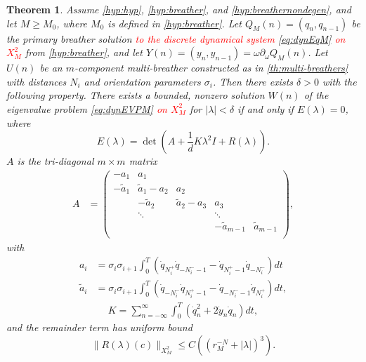 \documentclass[12pt,reqno]{amsart}
\newtheorem{theorem}{Theorem}
\theoremstyle{definition}
\newcommand{\revised}[1]{ \textcolor{red}{#1} }
\begin{document}
\begin{theorem}\label{th:spectrum}
Assume \cref{hyp:hyp}, \cref{hyp:breather}, and \cref{hyp:breathernondegen}, and let $M \geq M_0$, where $M_0$ is defined in \cref{hyp:breather}. Let $Q_M(n) = (q_n, q_{n-1})$ be the primary breather solution 
\revised{
to the discrete dynamical system \cref{eq:dynEqM} on $X_M^2$
}
from \cref{hyp:breather}, and let $Y(n) = (y_n, y_{n-1}) = \omega \partial_\omega Q_M(n)$.
Let $U(n)$ be an $m$-component multi-breather constructed as in \cref{th:multi-breathers} with distances $N_i$ and orientation parameters $\sigma_i$. Then there exists $\delta > 0$ with the following property. There exists a bounded, nonzero solution $W(n)$ of the eigenvalue problem \cref{eq:dynEVPM} 
\revised{on $X_M^2$
}
 for $|\lambda| < \delta$ if and only if $E(\lambda) = 0$, where
\begin{equation}\label{Elambda}
E(\lambda) = \det\left(A + \frac{1}{d}K \lambda^2 I + R(\lambda)\right).
\end{equation}
$A$ is the tri-diagonal $m \times m$ matrix
\begin{align}\label{eq:matrixA}
A &= \begin{pmatrix}
-a_1 & a_1 & & & \\
-\tilde{a}_1 & \tilde{a}_1 - a_2 & a_2 \\
& -\tilde{a}_2 & \tilde{a}_2 - a_3 & a_3 \\
& \ddots & & \ddots \\
& & & -\tilde{a}_{m-1} & \tilde{a}_{m-1}  \\
\end{pmatrix},
\end{align}
with
\begin{equation}\label{eq:ai}
\begin{aligned}
a_i &= \sigma_i \sigma_{i+1} \int_0^T \left( \dot{q}_{N_i^+}\dot{q}_{-N_i^- - 1} 
- \dot{q}_{N_i^+ - 1}\dot{q}_{-N_i^-} \right) dt \\
\tilde{a}_i &= \sigma_i \sigma_{i+1} \int_0^T \left( \dot{q}_{-N_i^-} \dot{q}_{N_i^+ - 1} 
- \dot{q}_{-N_i^- - 1}\dot{q}_{N_i^+} \right) dt,
\end{aligned}
\end{equation}
\begin{align}\label{eq:M}
K =
\sum_{n = -\infty}^\infty \int_0^T \left( \dot{q}_n^2 + 2 \dot{y}_n \dot{q}_n \right) dt,
\end{align}
and the remainder term has uniform bound
\begin{equation}\label{eq:Rbound}
\|R(\lambda)(c)\|_{X_M^2} \leq C \left( (r_M^{-N} + |\lambda|)^3\right).
\end{equation}
\end{theorem}
\end{document}
